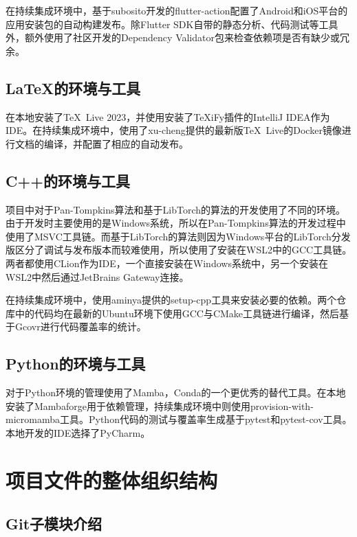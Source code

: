 在持续集成环境中，基于subosito开发的flutter-action配置了Android和iOS平台的应用安装包的自动构建发布。除Flutter SDK自带的静态分析、代码测试等工具外，额外使用了社区开发的Dependency Validator包来检查依赖项是否有缺少或冗余。

\subsection{\LaTeX 的环境与工具}\label{subsec:latex-env}

在本地安装了\TeX\ Live 2023，并使用安装了\TeX iFy插件的IntelliJ IDEA作为IDE。在持续集成环境中，使用了xu-cheng提供的最新版\TeX\ Live的Docker镜像进行文档的编译，并配置了相应的自动发布。

\subsection{C++的环境与工具}\label{subsec:cpp-env}

项目中对于Pan-Tompkins算法和基于LibTorch的算法的开发使用了不同的环境。由于开发时主要使用的是Windows系统，所以在Pan-Tompkins算法的开发过程中使用了MSVC工具链。而基于LibTorch的算法则因为Windows平台的LibTorch分发版区分了调试与发布版本而较难使用，所以使用了安装在WSL2中的GCC工具链。两者都使用CLion作为IDE，一个直接安装在Windows系统中，另一个安装在WSL2中然后通过JetBrains Gateway连接。

在持续集成环境中，使用aminya提供的setup-cpp工具来安装必要的依赖。两个仓库中的代码均在最新的Ubuntu环境下使用GCC与CMake工具链进行编译，然后基于Gcovr进行代码覆盖率的统计。

\subsection{Python的环境与工具}\label{subsec:python-env}

对于Python环境的管理使用了Mamba，Conda的一个更优秀的替代工具。在本地安装了Mambaforge用于依赖管理，持续集成环境中则使用provision-with-micromamba工具。Python代码的测试与覆盖率生成基于pytest和pytest-cov工具。本地开发的IDE选择了PyCharm。


\section{项目文件的整体组织结构}\label{sec:file-structure}

\subsection{Git子模块介绍}\label{subsec:git-submodule}

